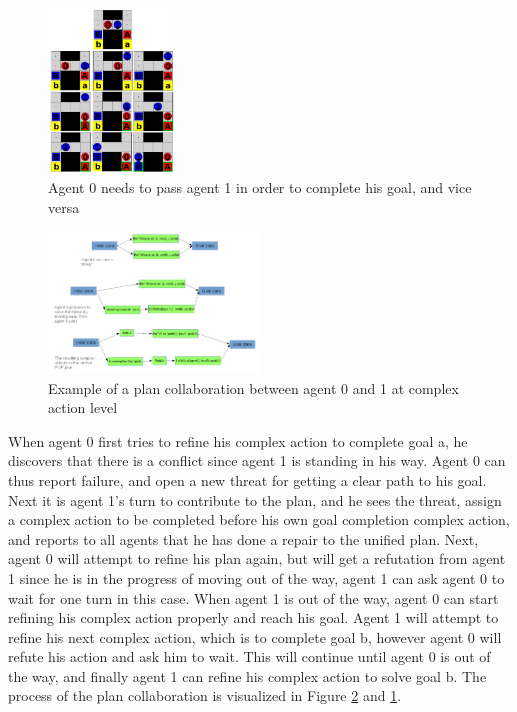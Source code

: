 \documentclass[Main]{subfiles}
\begin{document}
\begin{figure}[h!]
	\centering
	\includegraphics[width=0.3\textwidth]{plan_collab.png}
	\caption{Agent 0 needs to pass agent 1 in order to complete his goal, and vice versa}
	\label{fig:plan_collab}
\end{figure}

\begin{figure}[h!]
	\centering
	\includegraphics[width=0.5\textwidth]{unhtnpop.png}
	\caption{Example of a plan collaboration between agent 0 and 1 at complex action level}
	\label{fig:htn_collab}
\end{figure}


When agent 0 first tries to refine his complex action to complete goal a, he discovers that there is a conflict since agent 1 is standing in his way. Agent 0 can thus report failure, and open a new threat for getting a clear path to his goal. Next it is agent 1's turn to contribute to the plan, and he sees the threat, assign a complex action to be completed before his own goal completion complex action, and reports to all agents that he has done a repair to the unified plan. Next, agent 0 will attempt to refine his plan again, but will get a refutation from agent 1 since he is in the progress of moving out of the way, agent 1 can ask agent 0 to wait for one turn in this case. When agent 1 is out of the way, agent 0 can start refining his complex action properly and reach his goal. Agent 1 will attempt to refine his next complex action, which is to complete goal b, however agent 0 will refute his action and ask him to wait. This will continue until agent 0 is out of the way, and finally agent 1 can refine his complex action to solve goal b.
The process of the plan collaboration is visualized in Figure \ref{fig:htn_collab} and \ref{fig:plan_collab}.




\end{document}
